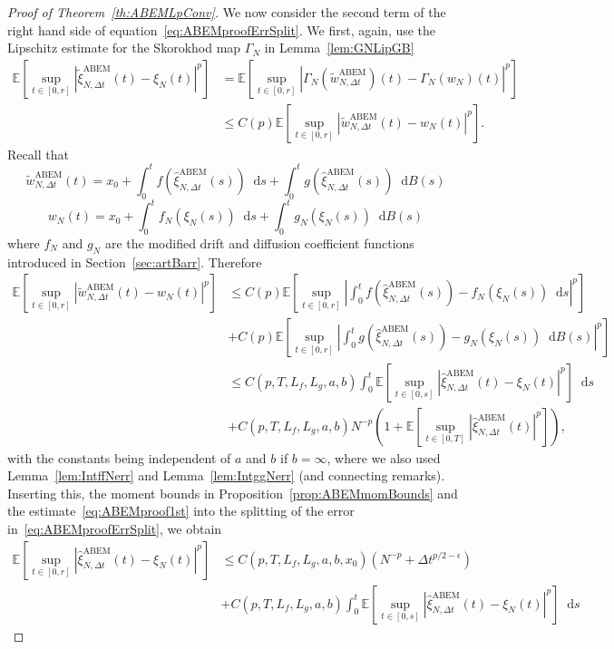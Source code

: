 \documentclass[11pt]{amsart}
\newcommand{\E}{{\mathbb E}}
\newcommand*\diff{\mathop{}\!\mathrm{d}}
\newcommand{\xiN}{\xi_{N}}
\newcommand{\xiNDt}{\hat{\xi}_{N,\Delta t}}
\newcommand{\txiNDt}{\tilde{\xi}_{N,\Delta t}}
\newcommand{\wN}{w_{N}}
\newcommand{\twNDt}{\tilde{w}_{N,\Delta t}}
\newcommand{\ABEM}{\textrm{ABEM}}
\begin{document}
{\begin{proof}[Proof of Theorem~\ref{th:ABEMLpConv}]
We now consider the second term of the right hand side of equation~\eqref{eq:ABEMproofErrSplit}. We first, again, use the Lipschitz estimate for the Skorokhod map $\Gamma_{N}$ in Lemma~\ref{lem:GNLipGB}
\begin{align*}
\E \left[ \sup_{t \in [0,r]} \left| \txiNDt^{\ABEM}(t) - \xi_{N}(t) \right|^{p} \right] &= \E \left[ \sup_{t \in [0,r]} \left| \Gamma_{N}(\twNDt^{\ABEM})(t) - \Gamma_{N}(\wN)(t) \right|^{p} \right] \\ &\leq C(p) \E \left[ \sup_{t \in [0,r]} \left| \twNDt^{\ABEM}(t) - \wN(t) \right|^{p} \right].
\end{align*}
Recall that
\begin{equation*}
\twNDt^{\ABEM}(t) = x_{0} + \int_{0}^{t} f(\xiNDt^{\ABEM}(s)) \diff s + \int_{0}^{t} g(\xiNDt^{\ABEM}(s)) \diff B(s)
\end{equation*}
\begin{equation*}
\wN(t) = x_{0} + \int_{0}^{t} f_{N}(\xiN(s)) \diff s + \int_{0}^{t} g_{N}(\xiN(s)) \diff B(s)
\end{equation*}
where $f_{N}$ and $g_{N}$ are the modified drift and diffusion coefficient functions introduced in Section~\ref{sec:artBarr}. Therefore
\begin{align*}
\E \left[ \sup_{t \in [0,r]} \left| \twNDt^{\ABEM}(t) - \wN(t) \right|^{p} \right] &\leq C(p) \E \left[ \sup_{t \in [0,r]} \left| \int_{0}^{t} f(\xiNDt^{\ABEM}(s)) - f_{N}(\xiN(s)) \diff s \right|^{p} \right] \\ &+ C(p) \E \left[ \sup_{t \in [0,r]} \left| \int_{0}^{t} g(\xiNDt^{\ABEM}(s)) - g_{N}(\xiN(s)) \diff B(s) \right|^{p} \right] \\ &\leq C(p,T,L_{f},L_{g},a,b) \int_{0}^{t}  \E \left[ \sup_{t \in [0,s]} \left| \xiNDt^{\ABEM}(t) - \xiN(t) \right|^{p} \right] \diff s \\ &+ C(p,T,L_{f},L_{g},a,b) N^{-p} \left( 1 + \E \left[ \sup_{t \in [0,T]} \left| \xiNDt^{\ABEM}(t) \right|^{p} \right] \right),
\end{align*}
with the constants being independent of $a$ and $b$ if $b=\infty$, where we also used Lemma~\ref{lem:IntffNerr} and Lemma~\ref{lem:IntggNerr} (and connecting remarks). Inserting this, the moment bounds in Proposition~\ref{prop:ABEMmomBounds} and the estimate~\eqref{eq:ABEMproof1st} into the splitting of the error in~\eqref{eq:ABEMproofErrSplit}, we obtain
\begin{align*}
\E \left[ \sup_{t \in [0,r]} \left| \hat{\xi}_{N,\Delta t}^{\ABEM}(t) - \xi_{N}(t) \right|^{p} \right] &\leq C(p,T,L_{f},L_{g},a,b,x_{0}) \left( N^{-p} + \Delta t^{p/2-\epsilon} \right) \\ &+ C(p,T,L_{f},L_{g},a,b) \int_{0}^{t} \E \left[ \sup_{t \in [0,s]} \left| \hat{\xi}_{N,\Delta t}^{\ABEM}(t) - \xi_{N}(t) \right|^{p} \right] \diff s

\end{align*}
\end{proof}}
\end{document}

